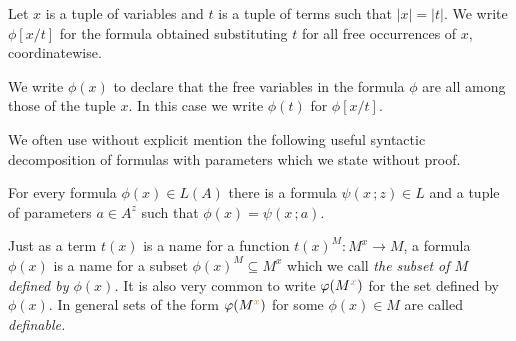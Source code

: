 Let $x$ is a tuple of variables and $t$ is a tuple of terms such that $|x|=|t|$.
We write $\phi[x/t]$ for the formula obtained substituting $t$ for all free occurrences of $x$, coordinatewise.

We write $\phi(x)$ to declare that the free variables in the formula $\phi$ are all among those of the tuple $x$.
In this case we write $\phi(t)$ for $\phi[x/t]$.

We often use without explicit mention the following useful syntactic decomposition of formulas with parameters which we state without proof.

\begin{lemma}\label{rappresentazione formule con parametri}
For every formula $\phi(x)\in L(A)$ there is a formula $\psi(x\,;z)\in L$ and a tuple of parameters $a\in A^z$ such that $\phi(x)=\psi(x\,;a)$.
\end{lemma}

Just as a term $t(x)$ is a name for a function $t(x)^M:M^{x}\to M$, a formula $\phi(x)$ is a name for a subset $\phi(x)^M\subseteq M^{x}$ which we call \emph{the subset of $M$ defined by $\phi(x)$.}
It is also very common to write \emph{$\varphi(M^{\color{brown} x})$} for the set defined by $\phi(x)$. In general sets of the form $\varphi(M^{\color{brown} x})$ for some $\phi(x)\in M$ are called \emph{definable.}


